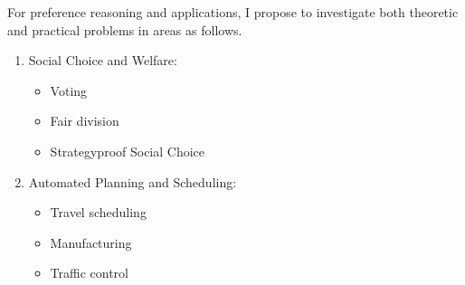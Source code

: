 For preference reasoning and applications, I propose to investigate both theoretic
and practical problems in areas as follows.
\begin{enumerate}
	\item Social Choice and Welfare\cite{arrow2010handbook,Brandt:COMSOC}:
		\begin{itemize}
			\item Voting
			\item Fair division
			\item Strategyproof Social Choice
		\end{itemize}
	\item Automated Planning and Scheduling\cite{son2006planning,bienvenu2011specifying,bast2015route}:
		\begin{itemize}
			\item Travel scheduling
			\item Manufacturing
			\item Traffic control
		\end{itemize}
\end{enumerate}
